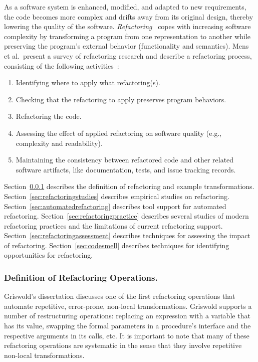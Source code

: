 As a software system is enhanced, modified, and adapted to new requirements, the code becomes more complex and drifts away from its original design, thereby lowering the quality of the software. {\em Refactoring}~\cite{1999:RID,Griswold:1992,Opdyke1992:ROF,Mens2004:SSR} copes with increasing software complexity by transforming a program from one representation to another while preserving the program's external behavior (functionality and semantics). Mens et al.~present a survey of refactoring research and describe a refactoring process, consisting of the following activities~\cite{Mens2004:SSR}:
\begin{enumerate}
\item Identifying where to apply what refactoring(s).
\item Checking that the refactoring to apply preserves program behaviors.
\item Refactoring the code.
\item Assessing the effect of applied refactoring on software quality (e.g., complexity and readability). 
\item Maintaining the consistency between refactored code and other related software artifacts, like documentation, tests, and issue tracking records.  
\end{enumerate}

Section~\ref{sec:refactoringdefinition} describes the definition of refactoring and example transformations. Section~\ref{sec:refactoringstudies} describes empirical studies on refactoring. Section~\ref{sec:automatedrefactoring} describes tool support for automated refactoring. Section~\ref{sec:refactoringpractice} describes several studies of modern refactoring practices and the limitations of current refactoring support. Section~\ref{sec:refactoringassessment} describes techniques for assessing the impact of refactoring. Section~\ref{sec:codesmell} describes techniques for identifying opportunities for refactoring. 

\subsubsection{Definition of Refactoring Operations.} 
\label{sec:refactoringdefinition} 

Griswold's dissertation \cite{Griswold:1992} discusses one of the first refactoring operations that automate repetitive, error-prone, non-local transformations. Griswold supports a number of restructuring operations: replacing an expression with a variable that has its value, swapping the formal parameters in a procedure's interface and the respective arguments in its calls, etc. It is important to note that many of these refactoring operations are systematic in the sense that they involve repetitive non-local transformations. 

